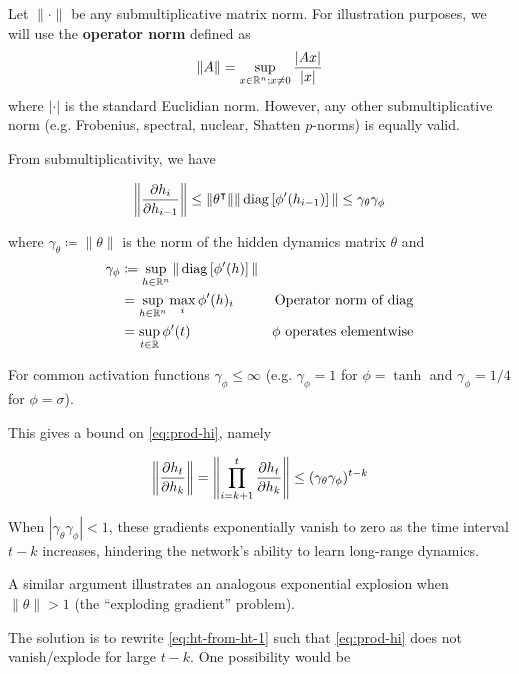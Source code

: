Let $\|\cdot\|$ be any submultiplicative matrix norm. For illustration purposes, we will use the
\textbf{operator norm} defined as
\begin{equation}
    \| A \| = \sup_{x \in \mathbb{R}^n; x \neq 0} \frac{|A x|}{|x|}
\end{equation}
where $|\cdot|$ is the standard Euclidian norm. However, any other submultiplicative norm
(e.g. Frobenius, spectral, nuclear, Shatten $p$-norms) is equally valid.

From submultiplicativity, we have

\begin{equation}
    \left\| \frac{\partial h_i}{\partial h_{i-1}} \right\|
    \leq \|\theta^\intercal\| \| \operatorname*{diag}\left[ \phi'(h_{i-1}) \right] \|
    \leq \gamma_{\theta} \gamma_\phi
\end{equation}

where $\gamma_\theta \coloneqq \|\theta\|$ is the norm of the hidden dynamics matrix $\theta$
and
\begin{align}
    \gamma_\phi
    &\coloneqq \sup_{h \in \mathbb{R}^n} \| \operatorname*{diag} \left[ \phi'(h) \right] \|  &\\
    &= \sup_{h \in \mathbb{R}^n} \max_i \phi'(h)_i &\mbox{Operator norm of diag} \\
    &= \sup_{t \in \mathbb{R}} \phi'(t) &\mbox{$\phi$ operates elementwise}
\end{align}

For common activation functions $\gamma_{\phi} \leq \infty$ (e.g. $\gamma_\phi = 1$ for $\phi = \tanh$
and $\gamma_\phi = 1/4$ for $\phi = \sigma$).

This gives a bound on \autoref{eq:prod-hi}, namely

\begin{equation}
    \left\| \frac{\partial h_t}{\partial h_k} \right\|
    = \left\| \prod_{i=k+1}^{t} \frac{\partial h_t}{\partial h_k} \right\|
    \leq (\gamma_\theta \gamma_\phi)^{t-k}
\end{equation}

When $|\gamma_\theta \gamma_\phi| < 1$, these gradients exponentially vanish to zero as
the time interval $t - k$ increases, hindering the network's ability to learn long-range
dynamics.

A similar argument \cite{Bengio1994} illustrates an analogous exponential explosion
when $\|\theta\| > 1$ (the ``exploding gradient'' problem).

The solution is to rewrite \autoref{eq:ht-from-ht-1} such that
\autoref{eq:prod-hi} does not vanish/explode for large $t - k$.
One possibility would be

